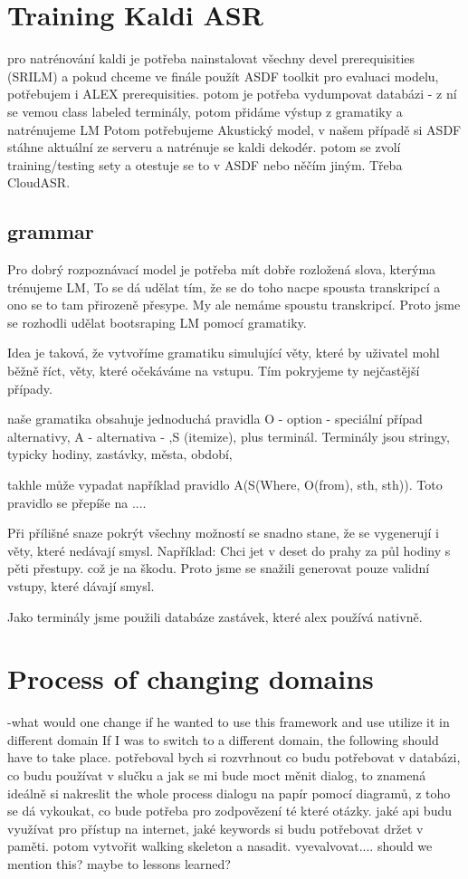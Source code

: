 \section{Training Kaldi ASR}

pro natrénování kaldi je potřeba nainstalovat všechny devel prerequisities (SRILM) a pokud chceme ve finále použít ASDF toolkit pro evaluaci modelu, potřebujem i ALEX prerequisities. potom je potřeba vydumpovat databázi - z ní se vemou class labeled terminály, potom přidáme výstup z gramatiky a natrénujeme LM Potom potřebujeme Akustický model, v našem případě si ASDF stáhne aktuální ze serveru a natrénuje se kaldi dekodér. potom se zvolí training/testing sety a otestuje se to v ASDF nebo něčím jiným. Třeba CloudASR.

\subsection{grammar}

Pro dobrý rozpoznávací model je potřeba mít dobře rozložená slova, kterýma trénujeme LM, To se dá udělat tím, že se do toho nacpe spousta transkripcí a ono se to tam přirozeně přesype. My ale nemáme spoustu transkripcí. Proto jsme se rozhodli udělat bootsraping LM pomocí gramatiky.

Idea je taková, že vytvoříme gramatiku simulující věty, které by uživatel mohl běžně říct, věty, které očekáváme na vstupu. Tím pokryjeme ty nejčastější případy.

naše gramatika obsahuje jednoduchá pravidla O - option - speciální případ alternativy, A - alternativa - ,S (itemize), plus terminál.
Terminály jsou stringy, typicky hodiny, zastávky, města, období, 

takhle může vypadat například pravidlo A(S(Where, O(from), sth, sth)). 
Toto pravidlo se přepíše na .... 

Při přílišné snaze pokrýt všechny možností se snadno stane, že se vygenerují i věty, které nedávají smysl. Například: Chci jet v deset do prahy za půl hodiny s pěti přestupy. což je na škodu. Proto jsme se snažili generovat pouze validní vstupy, které dávají smysl.

Jako terminály jsme použili databáze zastávek, které alex používá nativně.


\section{Process of changing domains} 
  -what would one change if he wanted to use this framework and use utilize it in different domain
  If I was to switch to a different domain, the following should have to take place.
  potřeboval bych si rozvrhnout co budu potřebovat v databázi, co budu používat v slučku a jak se mi bude moct měnit dialog, to znamená ideálně si nakreslit the whole process dialogu na papír pomocí diagramů, z toho se dá vykoukat, co bude potřeba pro zodpovězení té které otázky. jaké api budu využívat pro přístup na internet, jaké keywords si budu potřebovat držet v paměti. potom vytvořit walking skeleton a nasadit. vyevalvovat....
  should we mention this? maybe to lessons learned?

